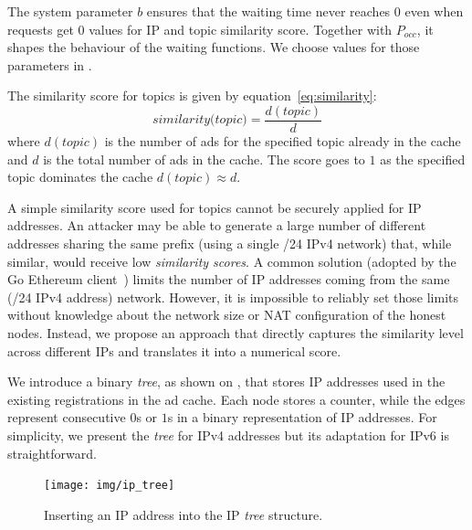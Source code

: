 The system parameter $b$ ensures that the waiting time never reaches $0$ even when requests get $0$ values for IP and topic similarity score. Together with $P_\textit{occ}$, it shapes the behaviour of the waiting functions. We choose values for those parameters in .

The similarity score for topics is given by equation~\ref{eq:similarity}:
\begin{equation}
\label{eq:similarity}
    \textit{similarity(topic)}= \frac{d(topic)}{d}
\end{equation}
where $d(topic)$ is the number of ads for the specified topic already in the cache and $d$ is the total number of ads in the cache. 
The score goes to $1$ as the specified topic dominates the cache $d(topic)  \approx  d$. 

A simple similarity score used for topics cannot be securely applied for IP addresses. 
An attacker may be able to generate a large number of different addresses sharing the same prefix (\eg using a single /24 IPv4 network) that, while similar, would receive low \emph{similarity scores}. 
A common solution (\eg adopted by the Go Ethereum client~\cite{geth}) limits the number of IP addresses coming from the same (\eg /24 IPv4 address) network.
However, it is impossible to reliably set those limits without knowledge about the network size or NAT configuration of the honest nodes. 
Instead, we propose an approach that directly captures the similarity level across different IPs and translates it into a numerical score. 

We introduce a binary \emph{tree}, as shown on , that stores IP addresses used in the existing registrations in the ad cache.
Each node stores a counter, while the edges represent consecutive $0$s or $1$s in a binary representation of IP addresses.
For simplicity,  we present the \emph{tree} for IPv4 addresses but its adaptation for IPv6 is straightforward.

\begin{figure}
    \texttt{[image: img/ip\_tree]}
    \caption{Inserting an IP address into the IP \emph{tree} structure. }
    \label{fig:ip_tree}
\end{figure}

